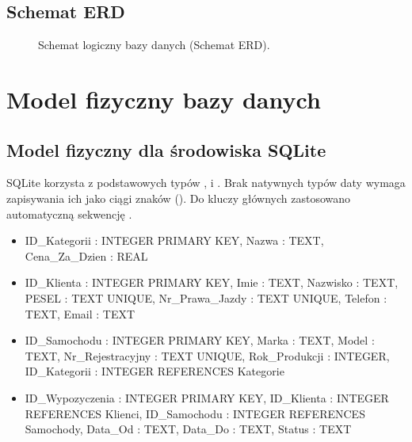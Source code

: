 \documentclass[a4paper,11pt,english,openany,oneside]{sphinxmanual}
\begin{document}
\subsection{Schemat ERD}
\label{\detokenize{rozdzial_3/index:schemat-erd}}
\begin{figure}[H]
\centering
\capstart

\noindent{}
\caption{Schemat logiczny bazy danych (Schemat ERD).}\label{\detokenize{rozdzial_3/index:id2}}\end{figure}


\section{Model fizyczny bazy danych}
\label{\detokenize{rozdzial_3/index:model-fizyczny-bazy-danych}}

\subsection{Model fizyczny dla środowiska SQLite}
\label{\detokenize{rozdzial_3/index:model-fizyczny-dla-srodowiska-sqlite}}
\sphinxAtStartPar
SQLite korzysta z podstawowych typów ,  i . Brak natywnych typów daty wymaga zapisywania ich jako ciągi znaków (). Do kluczy głównych zastosowano automatyczną sekwencję .
\begin{itemize}
\item {} 
\sphinxAtStartPar
{} ID\_Kategorii : INTEGER PRIMARY KEY, Nazwa : TEXT, Cena\_Za\_Dzien : REAL

\item {} 
\sphinxAtStartPar
{} ID\_Klienta : INTEGER PRIMARY KEY, Imie : TEXT, Nazwisko : TEXT, PESEL : TEXT UNIQUE, Nr\_Prawa\_Jazdy : TEXT UNIQUE, Telefon : TEXT, Email : TEXT

\item {} 
\sphinxAtStartPar
{} ID\_Samochodu : INTEGER PRIMARY KEY, Marka : TEXT, Model : TEXT, Nr\_Rejestracyjny : TEXT UNIQUE, Rok\_Produkcji : INTEGER, ID\_Kategorii : INTEGER REFERENCES Kategorie

\item {} 
\sphinxAtStartPar
{} ID\_Wypozyczenia : INTEGER PRIMARY KEY, ID\_Klienta : INTEGER REFERENCES Klienci, ID\_Samochodu : INTEGER REFERENCES Samochody, Data\_Od : TEXT, Data\_Do : TEXT, Status : TEXT

\end{itemize}
\end{document}
